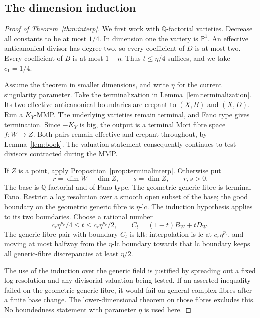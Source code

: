 \documentclass[11pt,reqno]{amsart}
\numberwithin{equation}{section}
\theoremstyle{definition}
\theoremstyle{remark}
\newcommand{\Q}{\mathbb Q}
\newcommand{\PP}{\mathbb P}
\begin{document}
\subsection{The dimension induction}
\begin{proof}[Proof of Theorem~\ref{thm:interp}]
We first work with $\Q$-factorial varieties. Decrease all constants to be at most $1/4$. In dimension one the variety is $\PP^1$. An effective anticanonical divisor has degree two, so every coefficient of $D$ is at most two. Every coefficient of $B$ is at most $1-\eta$. Thus $t\le\eta/4$ suffices, and we take $c_1=1/4$.

Assume the theorem in smaller dimensions, and write $\eta$ for the current singularity parameter. Take the terminalization in Lemma~\ref{lem:terminalization}. Its two effective anticanonical boundaries are crepant to $(X,B)$ and $(X,D)$. Run a $K_Y$-MMP. The underlying varieties remain terminal, and Fano type gives termination. Since $-K_Y$ is big, the output is a terminal Mori fibre space $f:W\to Z$. Both pairs remain effective and crepant throughout, by Lemma~\ref{lem:book}. The valuation statement consequently continues to test divisors contracted during the MMP.

If $Z$ is a point, apply Proposition~\ref{prop:terminalinterp}. Otherwise put
\[
 r=\dim W-\dim Z,\qquad s=\dim Z,
 \qquad r,s>0.
\]
The base is $\Q$-factorial and of Fano type. The geometric generic fibre is terminal Fano. Restrict a log resolution over a smooth open subset of the base; the good boundary on the geometric generic fibre is $\eta$-lc. The induction hypothesis applies to its two boundaries. Choose a rational number
\begin{equation}\label{eq:choose-t}
 c_r\eta^{p_r}/4\le t\le c_r\eta^{p_r}/2,
 \qquad C_t=(1-t)B_W+tD_W.
\end{equation}
The generic-fibre pair with boundary $C_t$ is klt: interpolation is lc at $c_r\eta^{p_r}$, and moving at most halfway from the $\eta$-lc boundary towards that lc boundary keeps all generic-fibre discrepancies at least $\eta/2$.

The use of the induction over the generic field is justified by spreading out a fixed log resolution and any divisorial valuation being tested. If an asserted inequality failed on the geometric generic fibre, it would fail on general complex fibres after a finite base change. The lower-dimensional theorem on those fibres excludes this. No boundedness statement with parameter $\eta$ is used here.


\end{proof}
\end{document}
